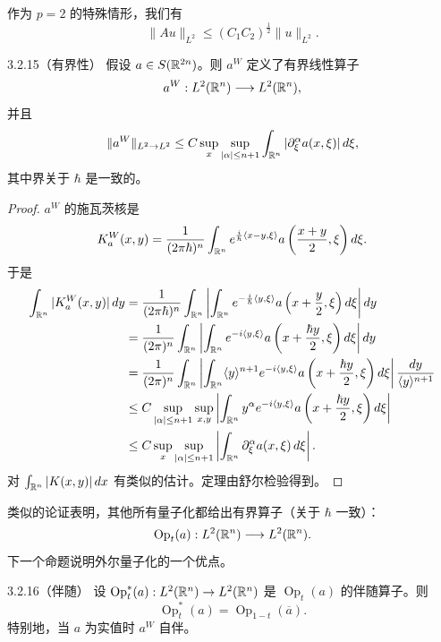 作为 $p=2$ 的特殊情形，我们有
\[
\|Au\|_{L^2}\le(C_1C_2)^{\frac12}\|u\|_{L^2}.
\]

\begin{theorem}{3.2.15}（有界性）
假设 $a\in S(\mathbb{R}^{2n})$。则 $a^W$ 定义了有界线性算子
\[
a^W:L^2(\mathbb{R}^n)\longrightarrow L^2(\mathbb{R}^n),
\]
并且
\[
\|a^W\|_{L^2\to L^2}\le C\sup_{x}\sup_{|\alpha|\le n+1}\int_{\mathbb{R}^n}|\partial_{\xi}^\alpha a(x,\xi)|\,d\xi,
\]
其中界关于 $\hbar$ 是一致的。
\end{theorem}


\begin{proof}
$a^W$ 的施瓦茨核是
\[
K_a^W(x,y)=\frac{1}{(2\pi\hbar)^n}\int_{\mathbb{R}^n}e^{\frac i\hbar\langle x-y,\xi\rangle}a\left(\frac{x+y}{2},\xi\right)d\xi.
\]
于是
\begin{align*}
\int_{\mathbb{R}^n}|K_a^W(x,y)|\,dy
&=\frac{1}{(2\pi\hbar)^n}\int_{\mathbb{R}^n}\left|\int_{\mathbb{R}^n}e^{-\frac i\hbar\langle y,\xi\rangle}a\left(x+\frac{y}{2},\xi\right)d\xi\right|dy\\
&=\frac{1}{(2\pi)^n}\int_{\mathbb{R}^n}\left|\int_{\mathbb{R}^n}e^{-i\langle y,\xi\rangle}a\left(x+\frac{\hbar y}{2},\xi\right)d\xi\right|dy\\
&=\frac{1}{(2\pi)^n}\int_{\mathbb{R}^n}\left|\int_{\mathbb{R}^n}\langle y\rangle^{n+1}e^{-i\langle y,\xi\rangle}a\left(x+\frac{\hbar y}{2},\xi\right)d\xi\right|\frac{dy}{\langle y\rangle^{n+1}}\\
&\le C\sup_{|\alpha|\le n+1}\sup_{x,y}\left|\int_{\mathbb{R}^n}y^\alpha e^{-i\langle y,\xi\rangle}a\left(x+\frac{\hbar y}{2},\xi\right)d\xi\right|\\
&\le C\sup_{x}\sup_{|\alpha|\le n+1}\left|\int_{\mathbb{R}^n}\partial^\alpha_{\xi}a(x,\xi)\,d\xi\right|.
\end{align*}
对 $\int_{\mathbb{R}^n}|K(x,y)|\,dx$ 有类似的估计。定理由舒尔检验得到。
\end{proof}

类似的论证表明，其他所有量子化都给出有界算子（关于 $\hbar$ 一致）：
\[
\operatorname{Op}_t(a):L^2(\mathbb{R}^n)\longrightarrow L^2(\mathbb{R}^n).
\]
下一个命题说明外尔量子化的一个优点。

\begin{proposition}{3.2.16}（伴随）
设 $\operatorname{Op}_t^*(a):L^2(\mathbb{R}^n)\to L^2(\mathbb{R}^n)$ 是 $\operatorname{Op}_t(a)$ 的伴随算子。则
\[
\operatorname{Op}_t^*(a)=\operatorname{Op}_{1-t}(\overline a).
\]
特别地，当 $a$ 为实值时 $a^W$ 自伴。
\end{proposition}


